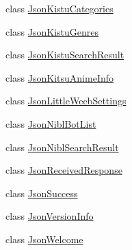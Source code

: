 \begin{DoxyCompactItemize}
\item 
class \mbox{\hyperlink{class_little_weeb_library_1_1_models_1_1_json_kistu_categories}{Json\+Kistu\+Categories}}
\item 
class \mbox{\hyperlink{class_little_weeb_library_1_1_models_1_1_json_kistu_genres}{Json\+Kistu\+Genres}}
\item 
class \mbox{\hyperlink{class_little_weeb_library_1_1_models_1_1_json_kistu_search_result}{Json\+Kistu\+Search\+Result}}
\item 
class \mbox{\hyperlink{class_little_weeb_library_1_1_models_1_1_json_kitsu_anime_info}{Json\+Kitsu\+Anime\+Info}}
\item 
class \mbox{\hyperlink{class_little_weeb_library_1_1_models_1_1_json_little_weeb_settings}{Json\+Little\+Weeb\+Settings}}
\item 
class \mbox{\hyperlink{class_little_weeb_library_1_1_models_1_1_json_nibl_bot_list}{Json\+Nibl\+Bot\+List}}
\item 
class \mbox{\hyperlink{class_little_weeb_library_1_1_models_1_1_json_nibl_search_result}{Json\+Nibl\+Search\+Result}}
\item 
class \mbox{\hyperlink{class_little_weeb_library_1_1_models_1_1_json_received_response}{Json\+Received\+Response}}
\item 
class \mbox{\hyperlink{class_little_weeb_library_1_1_models_1_1_json_success}{Json\+Success}}
\item 
class \mbox{\hyperlink{class_little_weeb_library_1_1_models_1_1_json_version_info}{Json\+Version\+Info}}
\item 
class \mbox{\hyperlink{class_little_weeb_library_1_1_models_1_1_json_welcome}{Json\+Welcome}}
\end{DoxyCompactItemize}
